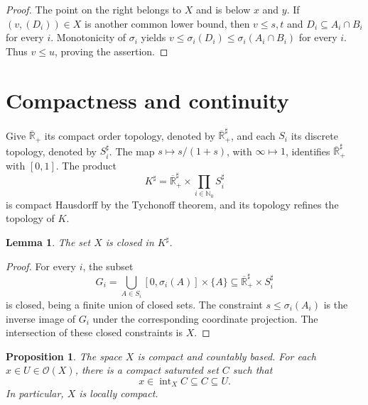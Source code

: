\documentclass[11pt]{amsart}
\newtheorem{proposition}[theorem]{Proposition}
\newtheorem{lemma}[theorem]{Lemma}
\theoremstyle{definition}
\theoremstyle{remark}
\numberwithin{equation}{section}
\newcommand{\NN}{\mathbb N}
\newcommand{\OO}{\mathcal O}
\newcommand{\RR}{\overline{\mathbb R}_{+}}
\newcommand{\intr}{\operatorname{int}}
\begin{document}
\begin{proof}
The point on the right belongs to $X$ and is below $x$ and $y$.
If $(v,(D_i))\in X$ is another common lower bound, then
$v\leq s,t$ and $D_i\subseteq A_i\cap B_i$ for every $i$.
Monotonicity of $\sigma_i$ yields
$v\leq\sigma_i(D_i)\leq\sigma_i(A_i\cap B_i)$ for every $i$.
Thus $v\leq u$, proving the assertion.
\end{proof}

\section{Compactness and continuity}\label{sec:topology}

Give $\RR$ its compact order topology, denoted by $\RR^{\sharp}$,
and each $S_i$ its discrete topology, denoted by $S_i^{\sharp}$.
The map $s\mapsto s/(1+s)$, with $\infty\mapsto1$, identifies
$\RR^{\sharp}$ with $[0,1]$. The product
\[
K^{\sharp}=\RR^{\sharp}\times\prod_{i\in\NN_0}S_i^{\sharp}
\]
is compact Hausdorff by the Tychonoff theorem, and its topology
refines the topology of $K$.

\begin{lemma}\label{lem:closed}
The set $X$ is closed in $K^{\sharp}$.
\end{lemma}

\begin{proof}
For every $i$, the subset
\[
G_i=\bigcup_{A\in S_i}[0,\sigma_i(A)]\times\{A\}
      \subseteq\RR^{\sharp}\times S_i^{\sharp}
\]
is closed, being a finite union of closed sets.
The constraint $s\leq\sigma_i(A_i)$ is the inverse image of $G_i$
under the corresponding coordinate projection. The intersection
of these closed constraints is $X$.
\end{proof}

\begin{proposition}\label{prop:compact}
The space $X$ is compact and countably based. For each $x\in U\in\OO(X)$,
there is a compact saturated set $C$ such that
\begin{equation}\label{eq:compact-nbhd}
x\in\intr_X C\subseteq C\subseteq U.
\end{equation}
In particular, $X$ is locally compact.
\end{proposition}
\end{document}
